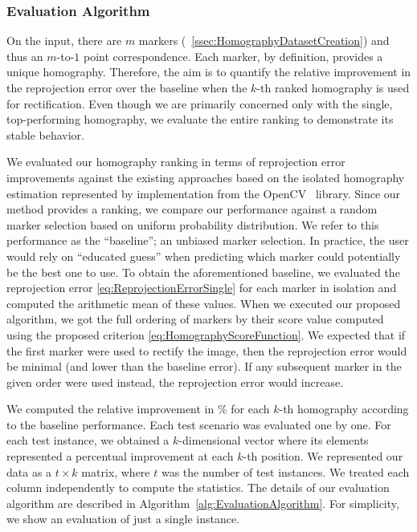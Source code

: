 \subsubsection{Evaluation Algorithm}
\label{sssec:EvaluationAlgorithm}

On the input, there are $m$ markers (\sectionstr{}~\ref{ssec:HomographyDatasetCreation}) and thus an $m$-to-$1$ point correspondence. Each marker, by definition, provides a unique homography. Therefore, the aim is to quantify the relative improvement in the reprojection error over the baseline when the $k$-th ranked homography is used for rectification. Even though we are primarily concerned only with the single, top-performing homography, we evaluate the entire ranking to demonstrate its stable behavior.

We evaluated our homography ranking in terms of reprojection error improvements against the existing approaches based on the isolated homography estimation represented by implementation from the OpenCV~\cite{bradski2008learning} library. Since our method provides a ranking, we compare our performance against a random marker selection based on uniform probability distribution. We refer to this performance as the ``baseline''; an unbiased marker selection. In practice, the user would rely on ``educated guess'' when predicting which marker could potentially be the best one to use. To obtain the aforementioned baseline, we evaluated the reprojection error \ref{eq:ReprojectionErrorSingle} for each marker in isolation and computed the arithmetic mean of these values. When we executed our proposed algorithm, we got the full ordering of markers by their score value computed using the proposed criterion \ref{eq:HomographyScoreFunction}. We expected that if the first marker were used to rectify the image, then the reprojection error would be minimal (and lower than the baseline error). If any subsequent marker in the given order were used instead, the reprojection error would increase.

We computed the relative improvement in \% for each $k$-th homography according to the baseline performance. Each test scenario was evaluated one by one. For each test instance, we obtained a $k$-dimensional vector where its elements represented a percentual improvement at each $k$-th position. We represented our data as a $t \times k$ matrix, where $t$ was the number of test instances. We treated each column independently to compute the statistics. The details of our evaluation algorithm are described in Algorithm~\ref{alg:EvaluationAlgorithm}. For simplicity, we show an evaluation of just a single instance.

